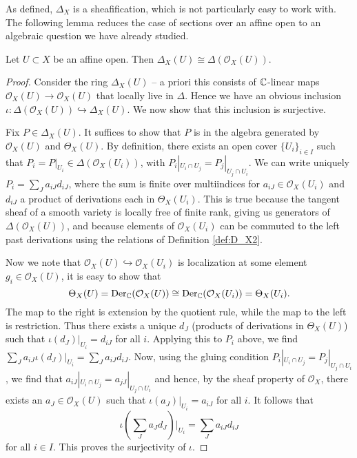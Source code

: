 As defined, $\Delta_X$ is a sheafification,
which is not particularly easy to work with. The following lemma reduces the case of
sections over an affine open to an algebraic question we have already studied.

\begin{lemma}
    Let $U\subset X$ be an affine open. Then $\Delta_X(U) \cong \Delta(\mathcal{O}_X(U)).$
    \label{lem:affine2}
\end{lemma}
\begin{proof}
    Consider the ring $\Delta_X(U)$ -- a priori this consists of $\mathbb{C}$-linear maps
    $\mathcal{O}_X(U)\to\mathcal{O}_X(U)$ that locally live in $\Delta$.
    Hence we have an obvious inclusion $\iota:\Delta(\mathcal{O}_X(U))\hookrightarrow \Delta_X(U)$.
    We now show that this inclusion is surjective.

    Fix $P\in\Delta_X(U)$. It suffices to show that $P$ is in the algebra generated by
    $\mathcal{O}_X(U)$ and $\Theta_X(U)$. By definition, there exists an open cover
    $\{U_i\}_{i\in I}$ such that $P_i=P|_{U_i}\in\Delta(\mathcal{O}_X(U_i))$, with
    $P_i|_{U_i\cap U_j}=P_j|_{U_j\cap U_i}$. We can write uniquely $P_i=\sum_J a_{iJ}d_{iJ}$,
    where the sum is finite over multiindices for $a_{iJ}\in\mathcal{O}_X(U_i)$ and $d_{iJ}$ a
    product of derivations each in $\Theta_X(U_i)$. This is true because the tangent sheaf
    of a smooth variety is locally free of finite rank, giving us generators of $\Delta(\mathcal{O}_X(U))$,
    and because elements of $\mathcal{O}_X(U_i)$ can be commuted to the left past derivations
    using the relations of Definition \ref{def:D_X2}.
    
    Now we note that
    $\mathcal{O}_X(U)\hookrightarrow \mathcal{O}_X(U_i)$ is localization at some element
    $g_i\in\mathcal{O}_X(U)$, it is easy to show that
    \[\Theta_X(U)=\operatorname{Der}_{\mathbb{C}}(\mathcal{O}_X(U))\cong\operatorname{Der}_{\mathbb{C}}(\mathcal{O}_X(U_i))=\Theta_X(U_i).\]
    The map to the right is extension by the quotient rule, while the map to the left is
    restriction.
    Thus there exists a unique $d_J$ (products of derivations in $\Theta_X(U)$) such
    that $\iota(d_J)|_{U_i}=d_{iJ}$ for all $i$.
    Applying this to $P_i$ above, we find $\sum_J a_{iJ}\iota(d_J)|_{U_i}=\sum_Ja_{iJ}d_{iJ}$.
    Now, using the gluing condition $P_i|_{U_i\cap U_j}=P_j|_{U_j\cap U_i}$,
    we find that $a_{iJ}|_{U_i\cap U_j}=a_{jJ}|_{U_j\cap U_i}$ and hence, by the sheaf
    property of $\mathcal{O}_X$, there exists an $a_J\in\mathcal{O}_X(U)$ such that
    $\iota(a_J)|_{U_i}=a_{iJ}$ for all $i$. It follows that
    \[\iota\left(\sum_Ja_Jd_J\right)\bigg|_{U_i}=\sum_Ja_{iJ}d_{iJ}\]
    for all $i\in I$. This proves the surjectivity of $\iota$.
\end{proof}

